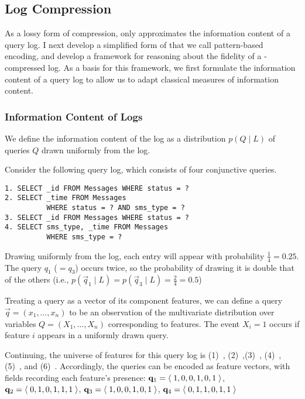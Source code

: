 \pagebreak

\subsection{Log Compression}
\label{queryrepresentation}

As a lossy form of compression, \systemnameone only approximates the information content of a query log.
I next develop a simplified form of \systemnameone that we call pattern-based encoding, and develop a framework for reasoning about the fidelity of a \systemnameone-compressed log.
As a basis for this framework, we first formulate the information content of a query log to allow us to adapt classical measures of information content.

\subsubsection{Information Content of Logs}
\label{sec:informationcontentoflogs}

We define the information content of the log as a distribution $p(Q\;|\;L)$ of queries $Q$ drawn uniformly from the log.

\begin{example}
\label{distributionExample}
Consider the following query log, which consists of four conjunctive queries.
\begin{lstlisting}
1. SELECT _id FROM Messages WHERE status = ?
2. SELECT _time FROM Messages 
          WHERE status = ? AND sms_type = ?
3. SELECT _id FROM Messages WHERE status = ?
4. SELECT sms_type, _time FROM Messages 
          WHERE sms_type = ?
\end{lstlisting}
Drawing uniformly from the log, each entry will appear with probability $\frac{1}{4} = 0.25$.
The query $q_1$ ($=q_3$) occurs twice, so the probability of drawing it is double that of the others (i.e., $p(\vec{q}_1\;|\;L) = p(\vec{q}_3\;|\;L) = \frac{2}{4} = 0.5$)
\end{example}

Treating a query as a vector of its component features, we can define a query $\vec{q}=(x_1,\ldots,x_n)$ to be an observation of the multivariate distribution over variables $Q = (X_1,\ldots,X_n)$ corresponding to features.
The event $X_i = 1$ occurs if feature $i$ appears in a uniformly drawn query.

\begin{example}
Continuing, the universe of features for this query log is (1)~, (2)~,\linebreak (3)~, (4)~, \linebreak (5)~, and (6)~.
Accordingly, the queries can be encoded as feature vectors, with fields recording each feature's presence:
{\small
$\mathbf{q}_1 = \left<\;{1, 0, 0, 1, 0, 1}\;\right>$, 
$\mathbf{q}_2 = \left<\;{0, 1, 0, 1, 1, 1}\;\right>$, 
$\mathbf{q}_3 = \left<\;{1, 0, 0, 1, 0, 1}\;\right>$, 
$\mathbf{q}_4 = \left<\;{0, 1, 1, 0, 1, 1}\;\right>$
}
\end{example}


